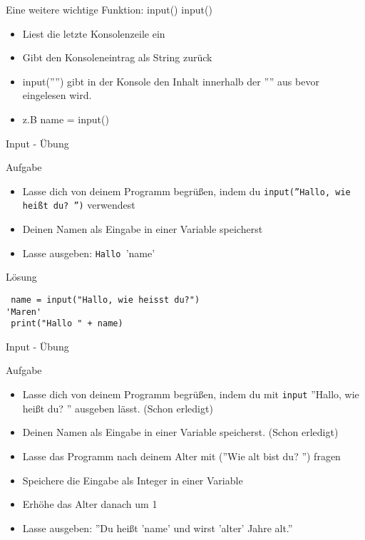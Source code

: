 \begin{frame}[fragile]{Eine weitere wichtige Funktion: input()}
input()
\begin{itemize}
\item Liest die letzte Konsolenzeile ein
\item Gibt den Konsoleneintrag als String zurück
\item input('''') gibt in der Konsole den Inhalt innerhalb der '''' aus bevor eingelesen wird.
\item z.B name = input() 
\end{itemize}
\end{frame}

\begin{frame}[fragile]{Input - Übung}   
\begin{block}{Aufgabe}
\begin{itemize}


\item Lasse dich von deinem Programm begrüßen, indem du
  \texttt{input(''Hallo, wie heißt du? '')} verwendest
\item Deinen Namen als Eingabe in einer Variable speicherst 
\item Lasse ausgeben: \texttt{Hallo }'name'
\end{itemize}
\end{block}
\pause{}
\begin{exampleblock}{Lösung}
\begin{lstlisting}
 name = input("Hallo, wie heisst du?")
'Maren'
 print("Hallo " + name)
\end{lstlisting}
\end{exampleblock}
\end{frame}

\begin{frame}[fragile]{Input - Übung}   
\begin{block}{Aufgabe}
	\begin{itemize}
		\item Lasse dich von deinem Programm begrüßen, indem du mit \texttt{input} ''Hallo, wie heißt du? '' ausgeben lässt. (Schon erledigt)
		\item Deinen Namen als Eingabe in einer Variable speicherst. (Schon erledigt)
		\item Lasse das Programm nach deinem Alter mit (''Wie alt bist du? '') fragen
		\item Speichere die Eingabe als Integer in einer Variable 
		\item Erhöhe das Alter danach um 1
		\item Lasse ausgeben: ''Du heißt 'name' und wirst 'alter' Jahre alt.''
	\end{itemize}
\end{block}
\end{frame}

